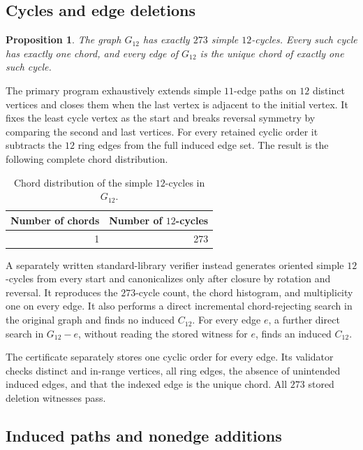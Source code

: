 \documentclass[11pt]{amsart}
\newcommand{\Ck}[1]{C_{#1}}
\newcommand{\Gtwelve}{G_{12}}
\newtheorem{proposition}[proposition]{Proposition}
\theoremstyle{definition}
\theoremstyle{remark}
\begin{document}
\subsection{Cycles and edge deletions}

\begin{proposition}\label{prop:c12-cycles}
The graph \(\Gtwelve\) has exactly \(273\) simple \(12\)-cycles.  Every such
cycle has exactly one chord, and every edge of \(\Gtwelve\) is the unique
chord of exactly one such cycle.
\end{proposition}

The primary program exhaustively extends simple \(11\)-edge paths on
\(12\) distinct vertices and closes them when the last vertex is adjacent to
the initial vertex.  It fixes the least cycle vertex as the start and breaks reversal
symmetry by comparing the second and last vertices.  For every retained
cyclic order it subtracts the \(12\) ring edges from the full induced edge
set.  The result is the following complete chord distribution.

\begin{table}[htbp]
\centering
\caption{Chord distribution of the simple \(12\)-cycles in \(\Gtwelve\).}
\label{tab:c12-chords}
\begin{tabular}{@{}rr@{}}
\toprule
Number of chords & Number of \(12\)-cycles \\
\midrule
1 & 273 \\
\bottomrule
\end{tabular}
\end{table}

A separately written standard-library verifier instead generates oriented
simple \(12\)-cycles from every start and canonicalizes only after closure by
rotation and reversal.  It reproduces the \(273\)-cycle count, the chord
histogram, and multiplicity one on every edge.  It also performs a direct
incremental chord-rejecting search in the original graph and finds no induced
\(\Ck{12}\).  For every edge \(e\), a further direct search in
\(\Gtwelve-e\), without reading the stored witness for \(e\), finds an
induced \(\Ck{12}\).

The certificate separately stores one cyclic order for every edge.  Its
validator checks distinct and in-range vertices, all ring edges, the absence
of unintended induced edges, and that the indexed edge is the unique chord.
All \(273\) stored deletion witnesses pass.

\subsection{Induced paths and nonedge additions}
\end{document}
